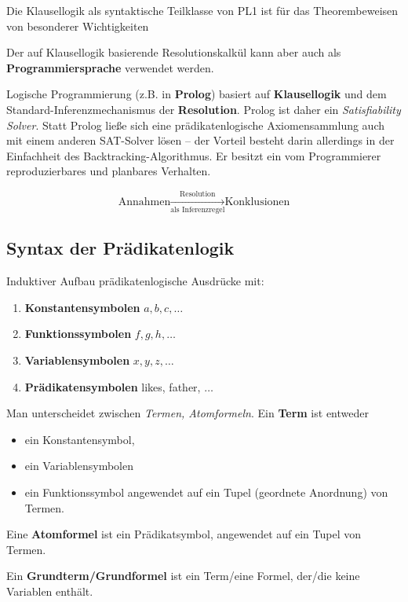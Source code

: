 \documentclass[runningheads,deutsch]{llncs}
\begin{document}
Die Klausellogik als syntaktische Teilklasse von PL1 ist für das Theorembeweisen von besonderer Wichtigkeiten

Der auf Klausellogik basierende Resolutionskalkül kann aber auch als \textbf{Programmiersprache} verwendet werden.

Logische Programmierung (z.B. in \textbf{Prolog}) basiert auf \textbf{Klausellogik} und dem Standard-Inferenzmechanismus der \textbf{Resolution}. Prolog ist daher ein \textit{Satisfiability Solver}. Statt Prolog ließe sich eine prädikatenlogische Axiomensammlung auch mit einem anderen SAT-Solver lösen -- der Vorteil besteht darin allerdings in der Einfachheit des Backtracking-Algorithmus. Er besitzt ein vom Programmierer reproduzierbares und planbares Verhalten. 

\[
    \text{Annahmen} \xrightarrow[\text{als Inferenzregel}]{\text{Resolution}} \text{Konklusionen}
\]

\subsection{Syntax der Prädikatenlogik}

Induktiver Aufbau prädikatenlogische Ausdrücke mit:

\begin{enumerate}
    \item \textbf{Konstantensymbolen} $a, b, c, \dots$
    \item \textbf{Funktionssymbolen} $f, g, h, \dots$
    \item \textbf{Variablensymbolen} $x, y, z, \dots$
    \item \textbf{Prädikatensymbolen} likes, father, $\dots$
\end{enumerate}

Man unterscheidet zwischen \textit{Termen, Atomformeln}.
Ein \textbf{Term} ist entweder

\begin{itemize}
    \item ein Konstantensymbol,
    \item ein Variablensymbolen
    \item ein Funktionssymbol angewendet auf ein Tupel (geordnete Anordnung) von Termen.
\end{itemize}

Eine \textbf{Atomformel} ist ein Prädikatsymbol, angewendet auf ein Tupel von Termen.

Ein \textbf{Grundterm/Grundformel} ist ein Term/eine Formel, der/die keine Variablen enthält.
\end{document}
